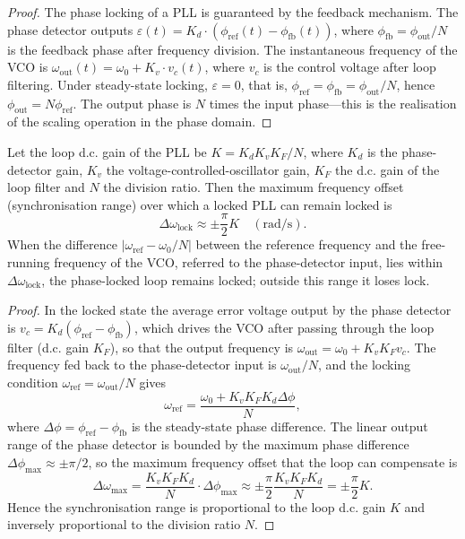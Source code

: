 \begin{proof}
The phase locking of a PLL is guaranteed by the feedback mechanism. The phase detector outputs $\varepsilon(t) = K_d \cdot (\phi_{\text{ref}}(t) - \phi_{\text{fb}}(t))$, where $\phi_{\text{fb}} = \phi_{\text{out}}/N$ is the feedback phase after frequency division. The instantaneous frequency of the VCO is $\omega_{\text{out}}(t) = \omega_0 + K_v \cdot v_c(t)$, where $v_c$ is the control voltage after loop filtering. Under steady-state locking, $\varepsilon = 0$, that is, $\phi_{\text{ref}} = \phi_{\text{fb}} = \phi_{\text{out}}/N$, hence $\phi_{\text{out}} = N\phi_{\text{ref}}$. The output phase is $N$ times the input phase---this is the realisation of the scaling operation in the phase domain.
\end{proof}

\begin{lemma}\label{ch24_pll_lock_range_lemma}
Let the loop d.c. gain of the PLL be $K = K_d K_v K_F / N$, where $K_d$ is the phase-detector gain, $K_v$ the voltage-controlled-oscillator gain, $K_F$ the d.c. gain of the loop filter and $N$ the division ratio. Then the maximum frequency offset (synchronisation range) over which a locked PLL can remain locked is
\[
\Delta\omega_{\text{lock}} \approx \pm \frac{\pi}{2} K \quad (\text{rad/s}).
\]
When the difference $|\omega_{\text{ref}} - \omega_0/N|$ between the reference frequency and the free-running frequency of the VCO, referred to the phase-detector input, lies within $\Delta\omega_{\text{lock}}$, the phase-locked loop remains locked; outside this range it loses lock.
\end{lemma}

\begin{proof}
In the locked state the average error voltage output by the phase detector is $v_c = K_d(\phi_{\text{ref}} - \phi_{\text{fb}})$, which drives the VCO after passing through the loop filter (d.c. gain $K_F$), so that the output frequency is $\omega_{\text{out}} = \omega_0 + K_v K_F v_c$. The frequency fed back to the phase-detector input is $\omega_{\text{out}}/N$, and the locking condition $\omega_{\text{ref}} = \omega_{\text{out}}/N$ gives
\[
\omega_{\text{ref}} = \frac{\omega_0 + K_v K_F K_d \Delta\phi}{N},
\]
where $\Delta\phi = \phi_{\text{ref}} - \phi_{\text{fb}}$ is the steady-state phase difference. The linear output range of the phase detector is bounded by the maximum phase difference $\Delta\phi_{\max} \approx \pm\pi/2$, so the maximum frequency offset that the loop can compensate is
\[
\Delta\omega_{\max} = \frac{K_v K_F K_d}{N}\cdot \Delta\phi_{\max} \approx \pm \frac{\pi}{2}\frac{K_v K_F K_d}{N} = \pm \frac{\pi}{2}K.
\]
Hence the synchronisation range is proportional to the loop d.c. gain $K$ and inversely proportional to the division ratio $N$.
\end{proof}


